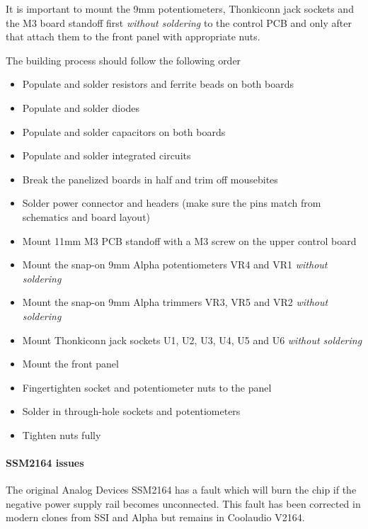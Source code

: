 \documentclass{article}
\begin{document}
\begin{flushleft}
It is important to mount the 9mm potentiometers, Thonkiconn jack sockets and the M3 board standoff first \emph{without soldering} to the control PCB and only after that attach them to the front panel with appropriate nuts.
\end{flushleft}

\begin{flushleft}
The building process should follow the following order

\begin{itemize}
\item Populate and solder resistors and ferrite beads on both boards
\item Populate and solder diodes
\item Populate and solder capacitors on both boards
\item Populate and solder integrated circuits
\item Break the panelized boards in half and trim off mousebites
\item Solder power connector and headers (make sure the pins match from schematics and board layout)
\item Mount 11mm M3 PCB standoff with a M3 screw on the upper control board
\item Mount the snap-on 9mm Alpha potentiometers VR4 and VR1 \emph{without soldering}
\item Mount the snap-on 9mm Alpha trimmers VR3, VR5 and VR2 \emph{without soldering}
\item Mount Thonkiconn jack sockets U1, U2, U3, U4, U5 and U6 \emph{without soldering}
\item Mount the front panel
\item Fingertighten socket and potentiometer nuts to the panel
\item Solder in through-hole sockets and potentiometers
\item Tighten nuts fully
\end{itemize}
\end{flushleft}

\paragraph{SSM2164 issues}
\begin{flushleft}
The original Analog Devices SSM2164 has a fault which will burn the chip if the negative power supply rail becomes unconnected. This fault has been corrected in modern clones from SSI and Alpha but remains in Coolaudio V2164. 
\end{flushleft}
\end{document}
